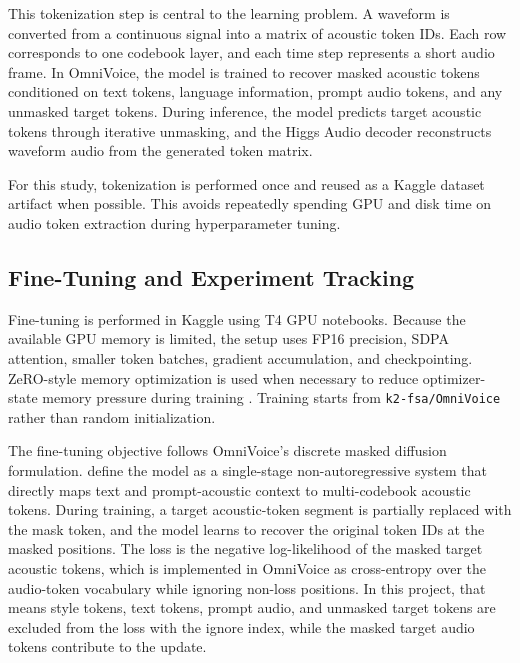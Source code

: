 \documentclass[11pt]{article}
\begin{document}
This tokenization step is central to the learning problem. A waveform is converted from a continuous signal into a matrix of acoustic token IDs. Each row corresponds to one codebook layer, and each time step represents a short audio frame. In OmniVoice, the model is trained to recover masked acoustic tokens conditioned on text tokens, language information, prompt audio tokens, and any unmasked target tokens. During inference, the model predicts target acoustic tokens through iterative unmasking, and the Higgs Audio decoder reconstructs waveform audio from the generated token matrix.

For this study, tokenization is performed once and reused as a Kaggle dataset artifact when possible. This avoids repeatedly spending GPU and disk time on audio token extraction during hyperparameter tuning.

\subsection{Fine-Tuning and Experiment Tracking}

Fine-tuning is performed in Kaggle using T4 GPU notebooks. Because the available GPU memory is limited, the setup uses FP16 precision, SDPA attention, smaller token batches, gradient accumulation, and checkpointing. ZeRO-style memory optimization is used when necessary to reduce optimizer-state memory pressure during training \citep{zero}. Training starts from \texttt{k2-fsa/OmniVoice} rather than random initialization.

The fine-tuning objective follows OmniVoice's discrete masked diffusion formulation. \citet{omnivoice} define the model as a single-stage non-autoregressive system that directly maps text and prompt-acoustic context to multi-codebook acoustic tokens. During training, a target acoustic-token segment is partially replaced with the mask token, and the model learns to recover the original token IDs at the masked positions. The loss is the negative log-likelihood of the masked target acoustic tokens, which is implemented in OmniVoice as cross-entropy over the audio-token vocabulary while ignoring non-loss positions. In this project, that means style tokens, text tokens, prompt audio, and unmasked target tokens are excluded from the loss with the ignore index, while the masked target audio tokens contribute to the update.
\end{document}
